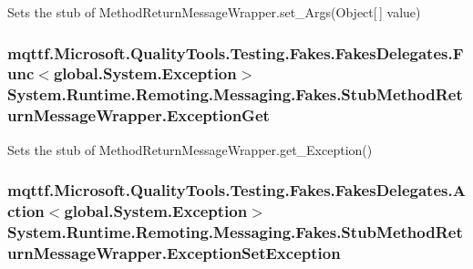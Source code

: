 Sets the stub of Method\-Return\-Message\-Wrapper.\-set\-\_\-\-Args(\-Object\mbox{[}$\,$\mbox{]} value)

\hypertarget{class_system_1_1_runtime_1_1_remoting_1_1_messaging_1_1_fakes_1_1_stub_method_return_message_wrapper_ad71e8c085c71b11010ae91c4bafd10cd}{
\subsubsection[{Exception\-Get}]{\setlength{\rightskip}{0pt plus 5cm}mqttf.\-Microsoft.\-Quality\-Tools.\-Testing.\-Fakes.\-Fakes\-Delegates.\-Func$<$global.\-System.\-Exception$>$ System.\-Runtime.\-Remoting.\-Messaging.\-Fakes.\-Stub\-Method\-Return\-Message\-Wrapper.\-Exception\-Get}}\label{class_system_1_1_runtime_1_1_remoting_1_1_messaging_1_1_fakes_1_1_stub_method_return_message_wrapper_ad71e8c085c71b11010ae91c4bafd10cd}


Sets the stub of Method\-Return\-Message\-Wrapper.\-get\-\_\-\-Exception()

\hypertarget{class_system_1_1_runtime_1_1_remoting_1_1_messaging_1_1_fakes_1_1_stub_method_return_message_wrapper_a353937ab7c7d72ae6253cc64f672477f}{
\subsubsection[{Exception\-Set\-Exception}]{\setlength{\rightskip}{0pt plus 5cm}mqttf.\-Microsoft.\-Quality\-Tools.\-Testing.\-Fakes.\-Fakes\-Delegates.\-Action$<$global.\-System.\-Exception$>$ System.\-Runtime.\-Remoting.\-Messaging.\-Fakes.\-Stub\-Method\-Return\-Message\-Wrapper.\-Exception\-Set\-Exception}}\label{class_system_1_1_runtime_1_1_remoting_1_1_messaging_1_1_fakes_1_1_stub_method_return_message_wrapper_a353937ab7c7d72ae6253cc64f672477f}


